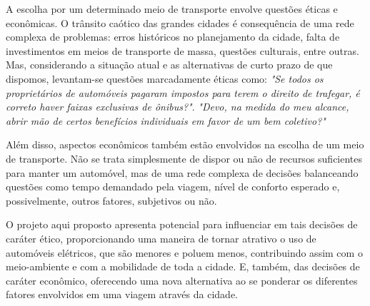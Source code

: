 \documentclass[12pt,journal,compsoc]{IEEEtran}
\begin{document}
A escolha por um determinado meio de transporte envolve questões éticas e
econômicas. O trânsito caótico das grandes cidades é consequência de uma rede
complexa de problemas: erros históricos no planejamento da cidade, falta de
investimentos em meios de transporte de massa, questões culturais, entre
outras. Mas, considerando a situação atual e as alternativas de curto prazo de
que dispomos, levantam-se questões marcadamente éticas como: \emph{"Se todos os
proprietários de automóveis pagaram impostos para terem o direito de trafegar,
é correto haver faixas exclusivas de ônibus?"}.  \emph{"Devo, na medida do meu
alcance, abrir mão de certos benefícios individuais em favor de um bem
coletivo?"}

Além disso, aspectos econômicos também estão envolvidos na escolha de um meio
de transporte. Não se trata simplesmente de dispor ou não de recursos suficientes
para manter um automóvel, mas de uma rede complexa de decisões balanceando
questões como tempo demandado pela viagem, nível de conforto esperado e,
possivelmente, outros fatores, subjetivos ou não.

O projeto aqui proposto apresenta potencial para influenciar em tais decisões de caráter ético, proporcionando uma maneira de tornar atrativo o uso de automóveis elétricos, que são menores e poluem menos, contribuindo assim com o meio-ambiente e com a mobilidade de toda a cidade. E, também, das decisões de caráter econômico, oferecendo uma nova alternativa ao se ponderar os diferentes fatores envolvidos em uma viagem através da cidade.



\end{document}
